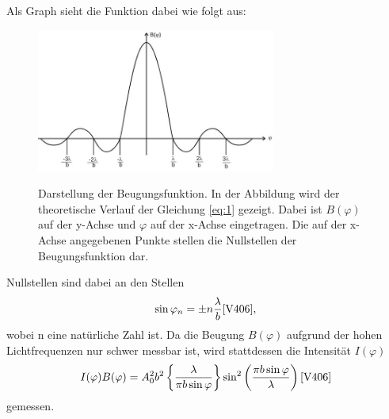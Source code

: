 Als Graph sieht die Funktion dabei wie folgt aus:
\begin{figure}[H]
    \centering
    \includegraphics[width=0.7\textwidth]{images/graph.jpg}
    \label{fig:2}
    \caption{Darstellung der Beugungsfunktion\cite{V406}.
    In der Abbildung wird der theoretische Verlauf der Gleichung \eqref{eq:1} gezeigt. 
    Dabei ist $B(\varphi)$ auf der y-Achse und $\varphi$ auf der x-Achse eingetragen.
    Die auf der x-Achse angegebenen Punkte stellen die Nullstellen der Beugungsfunktion dar.
    }
\end{figure}
\justifying Nullstellen sind dabei an den Stellen
\begin{align}
    \sin \varphi _n = \pm n \frac{\lambda}{b} \text{\cite{V406}} \label{eq:3},
\end{align}
wobei n eine natürliche Zahl ist.
Da die Beugung $B(\varphi)$ aufgrund der hohen Lichtfrequenzen nur schwer messbar ist,
wird stattdessen die Intensität $I(\varphi)$ 
\begin{align}
    I(\varphi)  B(\varphi) = A_0^2 b^2 \left\{\frac{\lambda}{\pi b \sin \varphi} \right\} \sin ^2 \left(\frac{\pi b \sin \varphi}{\lambda} \right) \text{\cite{V406}} \label{eq:4}
\end{align}
gemessen.\\


